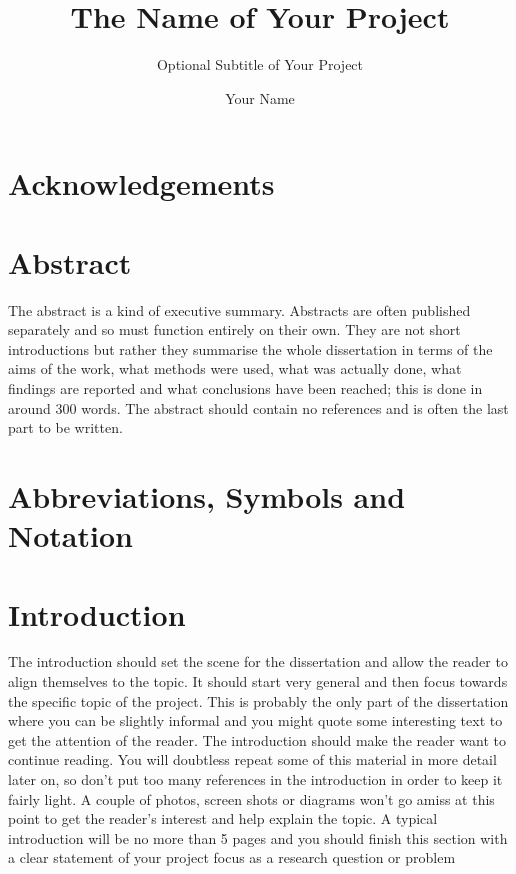\documentclass[a4paper, 12pt]{article}
\title{The Name of Your Project}
\author{Your Name}
\institute{Name of Your University}
\subtitle{Optional Subtitle of Your Project}
\begin{document}
	
\addfrontmatter


\section{Acknowledgements} %


\pagebreak


\section{Abstract} %
The abstract is a kind of executive summary. Abstracts are often published separately and so must function entirely on their own. They are not short introductions but rather they summarise the whole dissertation in terms of the aims of the work, what methods were used, what was actually done, what findings are reported and what conclusions have been reached; this is done in around 300 words. The abstract should contain no references and is often the last part to be written.

\pagebreak


\section{Abbreviations, Symbols and Notation} %


\pagebreak


\section{Introduction}
The introduction should set the scene for the dissertation and allow the reader to align themselves to the topic. It should start very general and then focus towards the specific topic of the project. This is probably the only part of the dissertation where you can be slightly informal and you might quote some interesting text to get the attention of the reader. The introduction should make the reader want to continue reading. You will doubtless repeat some of this material in more detail later on, so don’t put too many references in the introduction in order to keep it fairly light. A couple of photos, screen shots or diagrams won’t go amiss at this point to get the reader’s interest and help explain the topic. A typical introduction will be no more than 5 pages and you should finish this section with a clear statement of your project focus as a research question or problem
\end{document}
